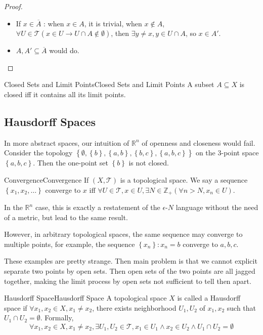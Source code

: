 \documentclass[../main.tex]{subfiles}
\begin{document}
\begin{proof}
\begin{itemize}
\item If $x\in \overline{A}$ : when $x\in A$, it is trivial, when $x\notin A$, $\forall U\in \mathcal{T}(x\in U \rightarrow U\cap A\notin \emptyset )$, then $\exists y\neq x,y\in U\cap A$, so $x\in A'$.
\item $A,A' \subseteq \overline{A}$ would do.
\end{itemize}
\end{proof}

\begin{corollary}{Closed Sets and Limit Points}{Closed Sets and Limit Points}
A subset $A \subseteq X$ is closed iff it contains all its limit points.
\end{corollary}

\subsection{Hausdorff Spaces}

In more abstract spaces, our intuition of $\mathbb{R}^n$ of openness and closeness would fail. Consider the topology $\left\{ \emptyset, \left\{ b \right\},\left\{ a,b \right\},\left\{ b,c \right\},\left\{ a,b,c \right\} \right\}$ on the 3-point space $\left\{ a,b,c \right\}$. Then the one-point set $\left\{ b \right\}$ is not closed.

\begin{definition}{Convergence}{Convergence}
If $(X,\mathcal{T})$ is a topological space. We say a sequence $\left\{ x_1,x_2, \ldots  \right\}$ converge to $x$ iff $\forall U\in \mathcal{T},x\in U, \exists N\in \mathbb{Z}_+(\forall n>N, x_n\in U)$.
\end{definition}

In the $\mathbb{R}^n$ case, this is exactly a restatement of the $\epsilon$-$N$ language without the need of a metric, but lead to the same result.

However, in arbitrary topological spaces, the same sequence may converge to multiple points, for example, the sequence $\left\{ x_n \right\}:x_n=b$ converge to $a,b,c$.

These examples are pretty strange. Then main problem is that we cannot explicit separate two points by open sets. Then open sets of the two points are all jagged together, making the limit process by open sets not sufficient to tell then apart.

\begin{definition}{Hausdorff Space}{Hausdorff Space}
A topological space $X$ is called a Hausdorff space if $\forall x_1,x_2\in X, x_1\neq x_2$, there exists neighborhood $U_1, U_2$ of $x_1, x_2$ such that $U_1\cap U_2 = \emptyset $. Formally,
\begin{equation}
\forall x_1,x_2\in X, x_1\neq x_2, \exists U_1,U_2\in \mathcal{T},x_1\in U_1\land x_2\in U_2\land U_1\cap U_2 = \emptyset 
\end{equation}
\end{definition}
\end{document}
